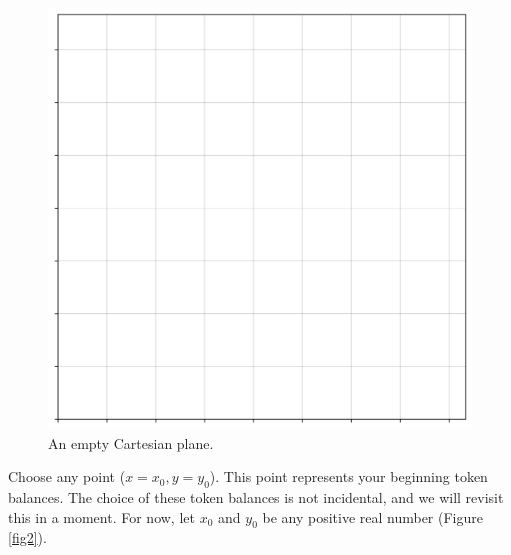 \documentclass{article}
\begin{document}
\begin{figure}[ht]
    \centering
    \includegraphics[width=\textwidth]{fig01.png}
    \captionsetup{
        justification=raggedright,
        singlelinecheck=false,
        font=small,
        labelfont=bf,
        labelsep=quad,
        format=plain
    }
    \caption{An empty Cartesian plane.}
    \label{fig1}
\end{figure}



Choose any point ($x = x_{0}, y = y_{0}$). This point represents your beginning token balances. The choice of these token balances is not incidental, and we will revisit this in a moment. For now, let $x_{0}$ and $y_{0}$ be any positive real number (Figure \ref{fig2}). 
\end{document}
